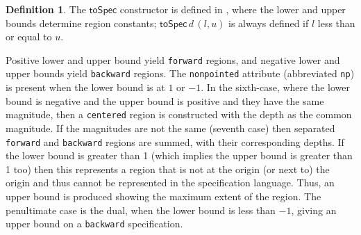 \documentclass[10pt,preprint]{sigplanconf}
\newcounter{block}
\theoremstyle{definition}
\newtheorem{definition}[block]{Definition}
\newcommand{\term}[1]{\texttt{#1}}
\begin{document}
\begin{definition} The $\mathsf{toSpec}$ constructor is defined
in , where the lower and upper bounds
determine region constants; $\mathsf{toSpec} \, d \, (l, u)$ is always defined
 if $l$ less than or equal to $u$.

Positive lower and upper bound yield \term{forward} regions, and
negative lower and upper bounds yield \term{backward} regions.
The \texttt{nonpointed} attribute (abbreviated \term{np})
is present when the lower bound is at $1$ or $-1$. 
In the sixth-case, where the lower bound
is negative and the upper bound is positive and they have the same
magnitude, then a \texttt{centered} region is constructed with
the depth as the common magnitude. If the magnitudes are not the same
(seventh case) then separated \texttt{forward} and \texttt{backward}
regions are summed, with their corresponding depths.
If the lower bound is greater than 1
(which implies the upper bound is greater than 1 too) then
this represents a region that is not at the origin (or next to) the
origin and thus cannot be represented in the specification language.
Thus, an upper bound is produced showing the maximum extent
of the region. The penultimate case is the dual, when the lower bound is less
than $-1$, giving an upper bound on a \texttt{backward} specification.
\end{definition}
\end{document}
